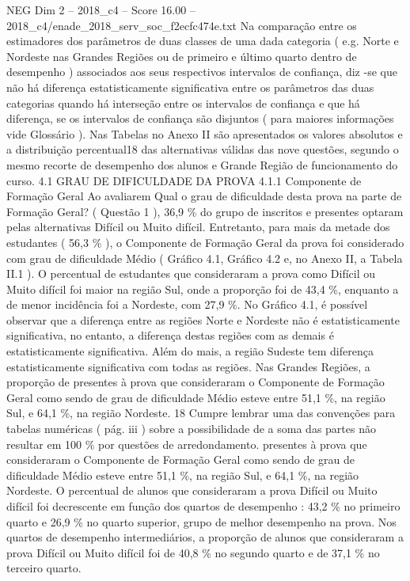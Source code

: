 \begin{textsample}{NEG Dim 2 – 2018\_c4 – Score 16.00 – 2018\_c4/enade\_2018\_serv\_soc\_f2ecfc474e.txt}
Na comparação entre os estimadores dos parâmetros de duas classes de uma dada categoria ( e.g.
Norte e Nordeste nas Grandes Regiões ou de primeiro e último quarto dentro de desempenho ) associados aos seus respectivos intervalos de confiança, diz -se que não há diferença estatisticamente significativa entre os parâmetros das duas categorias quando há interseção entre os intervalos de confiança e que há diferença, se os intervalos de confiança são disjuntos ( para maiores informações vide Glossário ).
Nas Tabelas no Anexo II são apresentados os valores absolutos e a distribuição percentual18 das alternativas válidas das nove questões, segundo o mesmo recorte de desempenho dos alunos e Grande Região de funcionamento do curso. 4.1 GRAU DE DIFICULDADE DA PROVA 4.1.1 Componente de Formação Geral Ao avaliarem Qual o grau de dificuldade desta prova na parte de Formação Geral? ( Questão 1 ), 36,9 \% do grupo de inscritos e presentes optaram pelas alternativas Difícil ou Muito difícil.
Entretanto, para mais da metade dos estudantes ( 56,3 \% ), o Componente de Formação Geral da prova foi considerado com grau de dificuldade Médio ( Gráfico 4.1, Gráfico 4.2 e, no Anexo II, a Tabela II.1 ).
O percentual de estudantes que consideraram a prova como Difícil ou Muito difícil foi maior na região Sul, onde a proporção foi de 43,4 \%, enquanto a de menor incidência foi a Nordeste, com 27,9 \%.
No Gráfico 4.1, é possível observar que a diferença entre as regiões Norte e Nordeste não é estatisticamente significativa, no entanto, a diferença destas regiões com as demais é estatisticamente significativa.
Além do mais, a região Sudeste tem diferença estatisticamente significativa com todas as regiões.
Nas Grandes Regiões, a proporção de presentes à prova que consideraram o Componente de Formação Geral como sendo de grau de dificuldade Médio esteve entre 51,1 \%, na região Sul, e 64,1 \%, na região Nordeste. 18 Cumpre lembrar uma das convenções para tabelas numéricas ( pág. iii ) sobre a possibilidade de a soma das partes não resultar em 100 \% por questões de arredondamento. presentes à prova que consideraram o Componente de Formação Geral como sendo de grau de dificuldade Médio esteve entre 51,1 \%, na região Sul, e 64,1 \%, na região Nordeste.
O percentual de alunos que consideraram a prova Difícil ou Muito difícil foi decrescente em função dos quartos de desempenho : 43,2 \% no primeiro quarto e 26,9 \% no quarto superior, grupo de melhor desempenho na prova.
Nos quartos de desempenho intermediários, a proporção de alunos que consideraram a prova Difícil ou Muito difícil foi de 40,8 \% no segundo quarto e de 37,1 \% no terceiro quarto.

\end{textsample}
